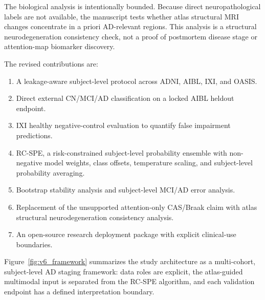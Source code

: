 The biological analysis is intentionally bounded. Because direct neuropathological labels are not available, the manuscript tests whether atlas structural MRI changes concentrate in a priori AD-relevant regions. This analysis is a structural neurodegeneration consistency check, not a proof of postmortem disease stage or attention-map biomarker discovery.

The revised contributions are:
\begin{enumerate}[leftmargin=*,itemsep=2pt,label=\textbf{C\arabic*.}]
    \item A leakage-aware subject-level protocol across ADNI, AIBL, IXI, and OASIS.
    \item Direct external CN/MCI/AD classification on a locked AIBL heldout endpoint.
    \item IXI healthy negative-control evaluation to quantify false impairment predictions.
    \item RC-SPE, a risk-constrained subject-level probability ensemble with non-negative model weights, class offsets, temperature scaling, and subject-level probability averaging.
    \item Bootstrap stability analysis and subject-level MCI/AD error analysis.
    \item Replacement of the unsupported attention-only CAS/Braak claim with atlas structural neurodegeneration consistency analysis.
    \item An open-source research deployment package with explicit clinical-use boundaries.
\end{enumerate}

Figure~\ref{fig:v6_framework} summarizes the study architecture as a multi-cohort, subject-level AD staging framework: data roles are explicit, the atlas-guided multimodal input is separated from the RC-SPE algorithm, and each validation endpoint has a defined interpretation boundary.

